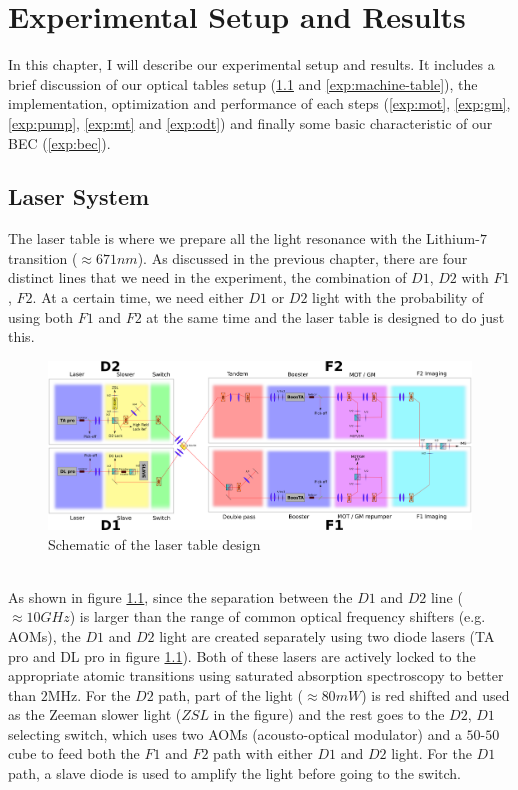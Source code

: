 \chapter{Experimental Setup and Results}

In this chapter, I will describe our experimental setup and results. It includes a brief discussion of our optical tables setup (\ref{exp:laser-table} and \ref{exp:machine-table}), the implementation, optimization and performance of each steps (\ref{exp:mot}, \ref{exp:gm}, \ref{exp:pump}, \ref{exp:mt} and \ref{exp:odt}) and finally some basic characteristic of our BEC (\ref{exp:bec}).

\section{Laser System}\label{exp:laser-table}
The laser table is where we prepare all the light resonance with the Lithium-$7$ transition ($\approx671nm$). As discussed in the previous chapter, there are four distinct lines that we need in the experiment, the combination of $D1$, $D2$ with $F1$, $F2$. At a certain time, we need either $D1$ or $D2$ light with the probability of using both $F1$ and $F2$ at the same time and the laser table is designed to do just this.\\
\begin{figure}
  \begin{center}
    \includegraphics[width=14cm]{laser_table.png}
  \end{center}
  \caption{Schematic of the laser table design}
  \label{exp:laser-table-design}
\end{figure}\\
As shown in figure \ref{exp:laser-table-design}, since the separation between the $D1$ and $D2$ line ($\approx10GHz$) is larger than the range of common optical frequency shifters (e.g. AOMs), the $D1$ and $D2$ light are created separately using two diode lasers (TA pro and DL pro in figure \ref{exp:laser-table-design}). Both of these lasers are actively locked to the appropriate atomic transitions using saturated absorption spectroscopy to better than $2\text{MHz}$. For the $D2$ path, part of the light ($\approx80mW$) is red shifted and used as the Zeeman slower light ($ZSL$ in the figure) and the rest goes to the $D2$, $D1$ selecting switch, which uses two AOMs (acousto-optical modulator) and a $50$-$50$ cube to feed both the $F1$ and $F2$ path with either $D1$ and $D2$ light. For the $D1$ path, a slave diode is used to amplify the light before going to the switch.\\

